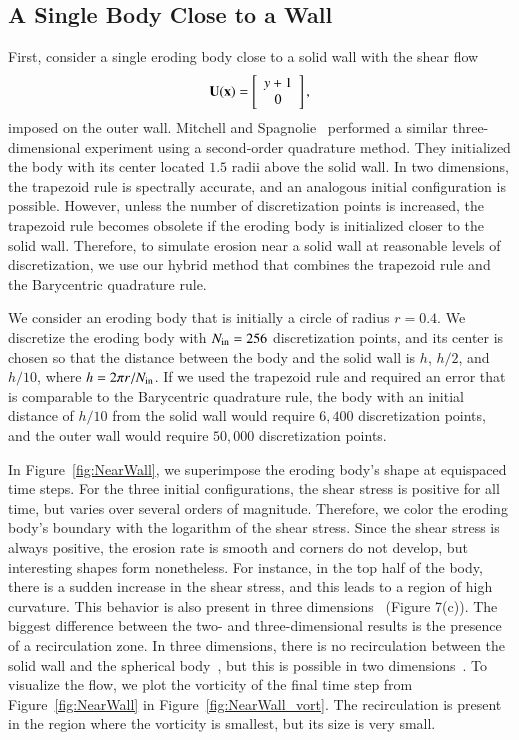 \documentclass[preprint,10pt]{elsarticle}
\begin{document}
\subsection{A Single Body Close to a Wall}
First, consider a single eroding body close to a solid wall with the
shear flow
\begin{align}
  {\mathbf{U}}({\mathbf{x}})=\left[
  \begin{array}{c}
    y+1 \\ 0
  \end{array}
  \right],
\end{align}
imposed on the outer wall. Mitchell and Spagnolie~\cite{mit-spa2017}
performed a similar three-dimensional experiment using a second-order
quadrature method.  They initialized the body with its center located
$1.5$ radii above the solid wall.  In two dimensions, the trapezoid rule
is spectrally accurate, and an analogous initial configuration is
possible. However, unless the number of discretization points is
increased, the trapezoid rule becomes obsolete if the eroding body is
initialized closer to the solid wall. Therefore, to simulate erosion
near a solid wall at reasonable levels of discretization, we use our
hybrid method that combines the trapezoid rule and the Barycentric
quadrature rule.

We consider an eroding body that is initially a circle of radius
$r=0.4$.  We discretize the eroding body with $N_{\mathrm{in}}=256$
discretization points, and its center is chosen so that the distance
between the body and the solid wall is $h$, $h/2$, and $h/10$, where $h
= 2\pi r/N_{\mathrm{in}}$.  If we used the trapezoid rule and required an error
that is comparable to the Barycentric quadrature rule, the body with an
initial distance of $h/10$ from the solid wall would require $6,400$
discretization points, and the outer wall would require $50,000$
discretization points.

In Figure~\ref{fig:NearWall}, we superimpose the eroding body's shape at
equispaced time steps.  For the three initial configurations, the shear
stress is positive for all time, but varies over several orders of
magnitude.  Therefore, we color the eroding body's boundary with the
logarithm of the shear stress.  Since the shear stress is always
positive, the erosion rate is smooth and corners do not develop, but
interesting shapes form nonetheless.  For instance, in the top half of
the body, there is a sudden increase in the shear stress, and this leads
to a region of high curvature.  This behavior is also present in three
dimensions~\cite{mit-spa2017} (Figure 7(c)).  The biggest difference
between the two- and three-dimensional results is the presence of a
recirculation zone.  In three dimensions, there is no recirculation
between the solid wall and the spherical body~\cite{cha-feu2003}, but
this is possible in two dimensions~\cite{chw-wu1975, hig1985}. To
visualize the flow, we plot the vorticity of the final time step from
Figure~\ref{fig:NearWall} in Figure~\ref{fig:NearWall_vort}.  The
recirculation is present in the region where the vorticity is smallest,
but its size is very small.
\end{document}

